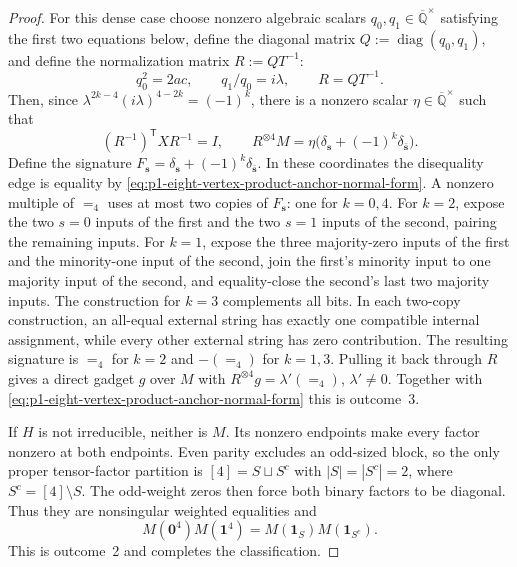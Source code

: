 \documentclass[11pt,letterpaper,onecolumn]{article}
\theoremstyle{plain}
\theoremstyle{definition}
\theoremstyle{remark}
\newcommand{\AlgNums}{\overline{\mathbb Q}}
\newcommand{\diag}{\operatorname{diag}}
\newcommand{\Eq}{=}
\newcommand{\one}{\mathbf 1}
\newcommand{\zero}{\mathbf 0}
\begin{document}
\begin{proof}
For this dense case choose nonzero algebraic scalars
\(q_0,q_1\in\AlgNums^\times\) satisfying the first two equations below,
define the diagonal matrix \(Q:=\diag(q_0,q_1)\), and define the
normalization matrix \(R:=QT^{-1}\):
\[
 q_0^2=2ac,\qquad q_1/q_0=i\lambda,\qquad R=QT^{-1}.
\]
Then, since
\(\lambda^{2k-4}(i\lambda)^{4-2k}=(-1)^k\), there is a nonzero scalar
\(\eta\in\AlgNums^\times\) such that
\begin{equation}
 (R^{-1})^{\mathsf T}XR^{-1}=I,\qquad
 R^{\otimes4}M=\eta\bigl(\delta_{\mathbf{s}}+(-1)^k\delta_{\bar {\mathbf{s}}}\bigr).
 \label{eq:p1-eight-vertex-product-anchor-normal-form}
\end{equation}
Define the signature
\(F_{\mathbf{s}}=\delta_{\mathbf{s}}+(-1)^k\delta_{\bar {\mathbf{s}}}\).  In these coordinates the
disequality edge is equality by \cref{eq:p1-eight-vertex-product-anchor-normal-form}.  A nonzero
multiple of \(\Eq_4\) uses at most two copies of \(F_{\mathbf{s}}\): one for
\(k=0,4\). For \(k=2\), expose the two
\(s=0\) inputs of the first and the two \(s=1\) inputs of the second, pairing
the remaining inputs. For \(k=1\), expose the three majority-zero inputs of
the first and the minority-one input of the second, join the first's
minority input to one majority input of the second, and equality-close the
second's last two majority inputs.  The construction for \(k=3\) complements all bits.
In each two-copy construction,
an all-equal external string has exactly one compatible internal assignment,
while every other external string has zero contribution.  The resulting
signature is \(\Eq_4\) for \(k=2\) and \(-(\Eq_4)\) for \(k=1,3\).
Pulling it back through \(R\) gives a
direct gadget \(g\) over \(M\) with \(R^{\otimes4}g=\lambda'(\Eq_4)\),
\(\lambda'\ne0\). Together with \cref{eq:p1-eight-vertex-product-anchor-normal-form}
this is outcome~3.

If \(H\) is not irreducible, neither is \(M\).  Its nonzero endpoints make
every factor nonzero at both endpoints.  Even parity excludes an odd-sized
block, so the only proper tensor-factor partition is
\([4]=S\sqcup S^c\) with \(|S|=|S^c|=2\), where
\(S^c=[4]\setminus S\). The odd-weight zeros then force both binary factors
to be diagonal.  Thus they are nonsingular weighted equalities and
\[
 M(\zero^4)M(\one^4)=M(\one_S)M(\one_{S^c}).
\]
This is outcome~2 and completes the classification.
\end{proof}
\end{document}
